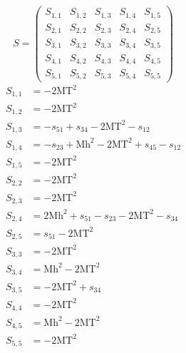 \documentclass[a4paper]{article}
\begin{document}
\begin{equation}
S=\left(\begin{array}{ccccc}
   S_{1,1}&
   S_{1,2}&
   S_{1,3}&
   S_{1,4}&
   S_{1,5}\\
   S_{2,1}&
   S_{2,2}&
   S_{2,3}&
   S_{2,4}&
   S_{2,5}\\
   S_{3,1}&
   S_{3,2}&
   S_{3,3}&
   S_{3,4}&
   S_{3,5}\\
   S_{4,1}&
   S_{4,2}&
   S_{4,3}&
   S_{4,4}&
   S_{4,5}\\
   S_{5,1}&
   S_{5,2}&
   S_{5,3}&
   S_{5,4}&
   S_{5,5}\end{array}\right)
\end{equation}
\begin{subequations}
\begin{align}
   S_{1,1}&=-2\text{MT}^2\\
   S_{1,2}&=-2\text{MT}^2\\
   S_{1,3}&=-s_{51}+s_{34}-2\text{MT}^2-s_{12}\\
   S_{1,4}&=-s_{23}+\text{Mh}^2-2\text{MT}^2+s_{45}-s_{12}\\
   S_{1,5}&=-2\text{MT}^2\\
   S_{2,2}&=-2\text{MT}^2\\
   S_{2,3}&=-2\text{MT}^2\\
   S_{2,4}&=2\text{Mh}^2+s_{51}-s_{23}-2\text{MT}^2-s_{34}\\
   S_{2,5}&=s_{51}-2\text{MT}^2\\
   S_{3,3}&=-2\text{MT}^2\\
   S_{3,4}&=\text{Mh}^2-2\text{MT}^2\\
   S_{3,5}&=-2\text{MT}^2+s_{34}\\
   S_{4,4}&=-2\text{MT}^2\\
   S_{4,5}&=\text{Mh}^2-2\text{MT}^2\\
   S_{5,5}&=-2\text{MT}^2
\end{align}
\end{subequations}
\end{document}
